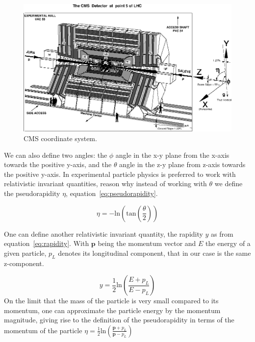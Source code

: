 \begin{figure}[!Hhtbp]
  \begin{center}
    \includegraphics[width=\textwidth]{figs/CMS_coordinates.jpg}
    \caption{CMS coordinate system. }
    \label{fig:cmscoor}
  \end{center}
\end{figure}

We can also define two angles: the $\phi$ angle in the x-y plane from the x-axis towards the positive y-axis, and the $\theta$ angle in the z-y plane from z-axis towards the positive y-axis. In experimental particle physics is preferred to work with relativistic invariant quantities, reason why instead of working with $\theta$ we define the pseudorapidity $\eta$, equation~\ref{eq:pseudorapidity}. 

\begin{equation}
  \label{eq:pseudorapidity}
  \eta = -\text{ln}\left( \text{tan}\left(\frac{\theta}{2}\right)\right)
\end{equation} 

One can define another relativistic invariant quantity, the rapidity $y$ as from equation~\ref{eq:rapidity}. With $\bm{p}$ being the momentum vector and $E$ the energy of a given particle, $p_{L}$ denotes its longitudinal component, that in our case is the same z-component. 

\begin{equation}
  \label{eq:rapidity}
  y=\frac{1}{2}\text{ln}\left(\frac{E+p_{L}}{E-p_{L}}\right)
\end{equation} On the limit that the mass of the particle is very small compared to its momentum, one can approximate the particle energy by the momentum magnitude, giving rise to the definition of the pseudorapidity in terms of the momentum of the particle $\eta = \frac{1}{2}\text{ln}\left(\frac{\bm{p}+p_{L}}{\bm{p}-p_{L}}\right)$

